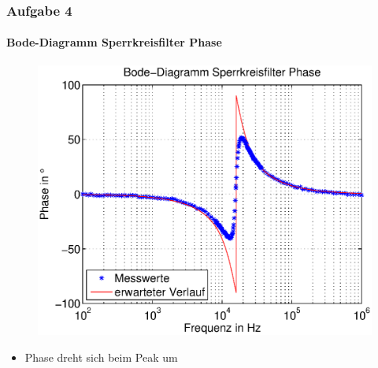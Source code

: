 \begin{frame}
    \frametitle{Aufgabe 4}
    \framesubtitle{Bode-Diagramm Sperrkreisfilter Phase}
     \begin{figure}[H]
     \begin{center}
             \includegraphics[scale=0.55]{./img/4b_Phase.eps}
     \end{center}
     \end{figure}
     \begin{itemize}
         \item Phase dreht sich beim Peak um
     \end{itemize}
\end{frame}
